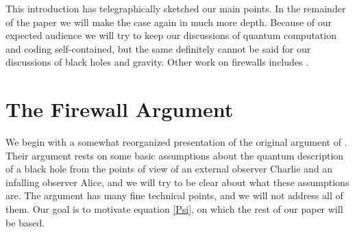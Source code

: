 \documentclass[12pt]{article}
\begin{document}
This introduction has telegraphically sketched our main points. In the remainder of the paper we will make the case again in much more depth.  Because of our expected audience we will try to keep our discussions of quantum computation and coding self-contained, but the same definitely cannot be said for our discussions of black holes and gravity.  Other work on firewalls includes \cite{Nomura:2012sw,Mathur:2012jk,Bena:2012zi,Giveon:2012kp,Chowdhury:2012vd,Avery:2012tf,Hossenfelder:2012mr,Hwang:2012nn,Larjo:2012jt,Page:2012zc,Giddings:2012gc}.

\section{The Firewall Argument}\label{firewallsect}
We begin with a somewhat reorganized presentation of the original argument of \cite{Almheiri:2012rt}.  Their argument rests on some basic assumptions about the quantum description of a black hole from the points of view of an external observer Charlie and an infalling observer Alice, and we will try to be clear about what these assumptions are.  The argument has many fine technical points, and we will not address all of them.  Our goal is to motivate equation \eqref{Psi}, on which the rest of our paper will be based.  
\end{document}
